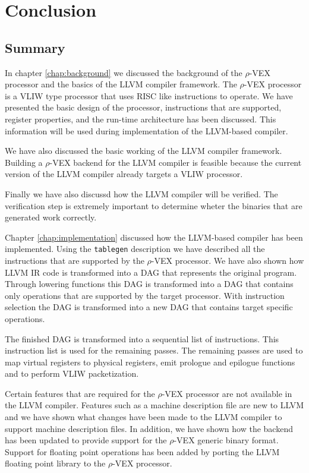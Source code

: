 \chapter{Conclusion}
\label{chap:conclusion}

\section{Summary}
In chapter \ref{chap:background} we discussed the background of the $\rho$-VEX processor and the basics of the LLVM compiler framework. The $\rho$-VEX processor is a VLIW type processor that uses RISC like instructions to operate. We have presented the basic design of the processor, instructions that are supported, register properties, and the run-time architecture has been discussed. This information will be used during implementation of the LLVM-based compiler.

We have also discussed the basic working of the LLVM compiler framework. Building a $\rho$-VEX backend for the LLVM compiler is feasible because the current version of the LLVM compiler already targets a VLIW processor. 

Finally we have also discussd how the LLVM compiler will be verified. The verification step is extremely important to determine wheter the binaries that are generated work correctly.

Chapter \ref{chap:implementation} discussed how the LLVM-based compiler has been implemented. Using the \texttt{tablegen} description we have described all the instructions that are supported by the $\rho$-VEX processor. We have also shown how LLVM IR code is transformed into a DAG that represents the original program. Through lowering functions this DAG is transformed into a DAG that contains only operations that are supported by the target processor. With instruction selection the DAG is transformed into a new DAG that contains target specific operations.

The finished DAG is transformed into a sequential list of instructions. This instruction list is used for the remaining passes. The remaining passes are used to map virtual registers to physical registers, emit prologue and epilogue functions and to perform VLIW packetization.

Certain features that are required for the $\rho$-VEX processor are not available in the LLVM compiler. Features such as a machine description file are new to LLVM and we have shown what changes have been made to the LLVM compiler to support machine description files. In addition, we have shown how the backend has been updated to provide support for the $\rho$-VEX generic binary format. Support for floating point operations has been added by porting the LLVM floating point library to the $\rho$-VEX processor.

